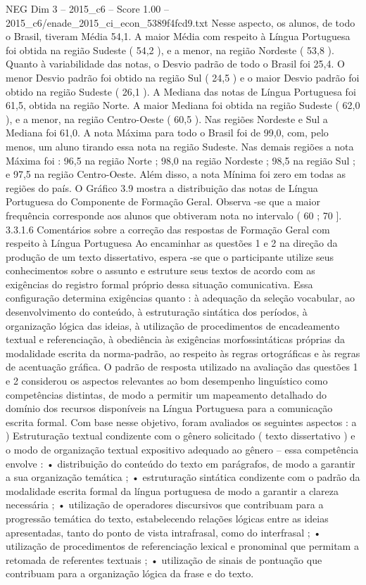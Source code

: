 \begin{textsample}{NEG Dim 3 – 2015\_c6 – Score 1.00 – 2015\_c6/enade\_2015\_ci\_econ\_5389f4fcd9.txt}
Nesse aspecto, os alunos, de todo o Brasil, tiveram Média 54,1.
A maior Média com respeito à Língua Portuguesa foi obtida na região Sudeste ( 54,2 ), e a menor, na região Nordeste ( 53,8 ).
Quanto à variabilidade das notas, o Desvio padrão de todo o Brasil foi 25,4.
O menor Desvio padrão foi obtido na região Sul ( 24,5 ) e o maior Desvio padrão foi obtido na região Sudeste ( 26,1 ).
A Mediana das notas de Língua Portuguesa foi 61,5, obtida na região Norte.
A maior Mediana foi obtida na região Sudeste ( 62,0 ), e a menor, na região Centro-Oeste ( 60,5 ).
Nas regiões Nordeste e Sul a Mediana foi 61,0.
A nota Máxima para todo o Brasil foi de 99,0, com, pelo menos, um aluno tirando essa nota na região Sudeste.
Nas demais regiões a nota Máxima foi : 96,5 na região Norte ; 98,0 na região Nordeste ; 98,5 na região Sul ; e 97,5 na região Centro-Oeste.
Além disso, a nota Mínima foi zero em todas as regiões do país.
O Gráfico 3.9 mostra a distribuição das notas de Língua Portuguesa do Componente de Formação Geral.
Observa -se que a maior frequência corresponde aos alunos que obtiveram nota no intervalo ( 60 ; 70 ]. 3.3.1.6 Comentários sobre a correção das respostas de Formação Geral com respeito à Língua Portuguesa Ao encaminhar as questões 1 e 2 na direção da produção de um texto dissertativo, espera -se que o participante utilize seus conhecimentos sobre o assunto e estruture seus textos de acordo com as exigências do registro formal próprio dessa situação comunicativa.
Essa configuração determina exigências quanto : à adequação da seleção vocabular, ao desenvolvimento do conteúdo, à estruturação sintática dos períodos, à organização lógica das ideias, à utilização de procedimentos de encadeamento textual e referenciação, à obediência às exigências morfossintáticas próprias da modalidade escrita da norma-padrão, ao respeito às regras ortográficas e às regras de acentuação gráfica.
O padrão de resposta utilizado na avaliação das questões 1 e 2 considerou os aspectos relevantes ao bom desempenho linguístico como competências distintas, de modo a permitir um mapeamento detalhado do domínio dos recursos disponíveis na Língua Portuguesa para a comunicação escrita formal.
Com base nesse objetivo, foram avaliados os seguintes aspectos : a ) Estruturação textual condizente com o gênero solicitado ( texto dissertativo ) e o modo de organização textual expositivo adequado ao gênero – essa competência envolve : • distribuição do conteúdo do texto em parágrafos, de modo a garantir a sua organização temática ; • estruturação sintática condizente com o padrão da modalidade escrita formal da língua portuguesa de modo a garantir a clareza necessária ; • utilização de operadores discursivos que contribuam para a progressão temática do texto, estabelecendo relações lógicas entre as ideias apresentadas, tanto do ponto de vista intrafrasal, como do interfrasal ; • utilização de procedimentos de referenciação lexical e pronominal que permitam a retomada de referentes textuais ; • utilização de sinais de pontuação que contribuam para a organização lógica da frase e do texto.

\end{textsample}
